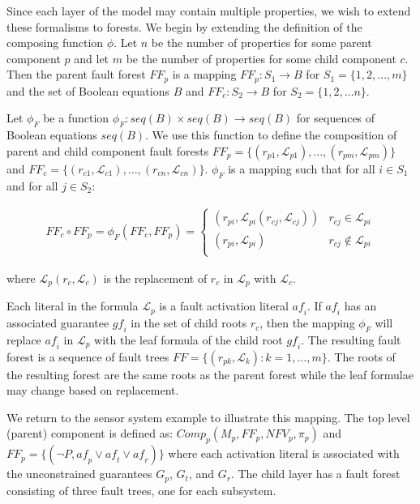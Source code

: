 Since each layer of the model may contain multiple properties, we wish to extend these formalisms to forests. We begin by extending the definition of the composing function $\phi$. Let $n$ be the number of properties for some parent component $p$ and let $m$ be the number of properties for some child component $c$. Then the parent fault forest $\mathit{FF}_p$ is a mapping $\mathit{FF}_p : S_1 \rightarrow B$ for $S_1 = \{1,2,\dots,m\}$ and the set of Boolean equations $B$ and $\mathit{FF}_c: S_2 \rightarrow B$ for $S_2 = \{1,2,\dots n\}$. 

Let $\phi_F$ be a function $\phi _F: \mathit{seq(B)} \times \mathit{seq(B)} \rightarrow \mathit{seq(B)}$ for sequences of Boolean equations $\mathit{seq(B)}$. We use this function to define the composition of parent and child component fault forests $\mathit{FF}_p = \{(r_{p1},\mathcal{L}_{p1}), \dots, (r_ {pm}, \mathcal{L}_{pm})\}$ and $\mathit{FF}_c = \{(r_{c1},\mathcal{L}_{c1}), \dots, (r_ {cn}, \mathcal{L}_{cn})\}$. $\phi_F$ is a mapping such that for all $i \in S_1$ and for all $j \in S_2$: 

\begin{gather}
\mathit{FF}_c \circ \mathit{FF}_p = \phi_F(\mathit{FF}_c, \mathit{FF}_p) =\begin{cases} 
      (r_{pi}, \mathcal{L}_{pi}(r_{cj}, \mathcal{L}_{cj})) & r_{cj} \in \mathcal{L}_{pi} \\
      (r_{pi}, \mathcal{L}_{pi}) & r_{cj} \not\in \mathcal{L}_{pi} \\
   \end{cases}
\end{gather}

where $\mathcal{L}_p(r_c, \mathcal{L}_c)$ is the replacement of $r_c$ in $\mathcal{L}_p$ with $\mathcal{L}_c$.

Each literal in the formula $\mathcal{L}_p$ is a fault activation literal $\mathit{af}_i$. If $\mathit{af}_i$ has an associated guarantee $\mathit{gf}_i$ in the set of child roots $r_c$, then the mapping $\phi_F$ will replace $\mathit{af}_i$ in $\mathcal{L}_p$ with the leaf formula of the child root $\mathit{gf}_i$.  The resulting fault forest is a sequence of fault trees $\mathit{FF} = \{(r_{pk}, \mathcal{L}_{k}): k = 1,\dots,m\}$. The roots of the resulting forest are the same roots as  the parent forest while the leaf formulae may change based on replacement. 


We return to the sensor system example to illustrate this mapping. The top level (parent) component is defined as: $\mathit{Comp}_p (M_p, \mathit{FF}_p, \mathit{NFV}_p, \pi_p)$ and $\mathit{FF}_p = \{(\neg P, \mathit{af}_p \lor \mathit{af}_t \lor \mathit{af}_r)\}$ where each activation literal is associated with the unconstrained guarantees $G_p$, $G_t$, and $G_r$. The child layer has a fault forest consisting of three fault trees, one for each subsystem. 

